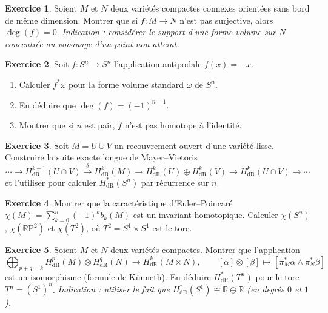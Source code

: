 \documentclass[12pt,a4paper,openany]{book}
\theoremstyle{definition}
\newtheorem{exercice}{Exercice}[chapter]
\theoremstyle{plain}
\theoremstyle{remark}
\newcommand{\R}{\mathbb{R}}
\begin{document}
\begin{exercice}\label{exo:stokes-7}
Soient $M$ et $N$ deux variétés compactes connexes orientées sans bord de même
dimension. Montrer que si $f \colon M \to N$ n'est pas surjective, alors
$\deg(f) = 0$.
\textit{Indication : considérer le support d'une forme volume sur $N$ concentrée
au voisinage d'un point non atteint.}
\end{exercice}

\begin{exercice}\label{exo:stokes-8}
Soit $f \colon S^n \to S^n$ l'application antipodale $f(x) = -x$.
\begin{enumerate}[label=(\alph*)]
  \item Calculer $f^*\omega$ pour la forme volume standard $\omega$ de $S^n$.
  \item En déduire que $\deg(f) = (-1)^{n+1}$.
  \item Montrer que si $n$ est pair, $f$ n'est pas homotope à l'identité.
\end{enumerate}
\end{exercice}

\begin{exercice}\label{exo:stokes-9}
Soit $M = U \cup V$ un recouvrement ouvert d'une variété lisse. Construire la
suite exacte longue de Mayer--Vietoris
\[
  \cdots \to H^{k-1}_{\mathrm{dR}}(U \cap V) \xrightarrow{\delta}
  H^k_{\mathrm{dR}}(M) \to H^k_{\mathrm{dR}}(U) \oplus H^k_{\mathrm{dR}}(V)
  \to H^k_{\mathrm{dR}}(U \cap V) \to \cdots
\]
et l'utiliser pour calculer $H^*_{\mathrm{dR}}(S^n)$ par récurrence sur $n$.
\end{exercice}

\begin{exercice}\label{exo:stokes-10}
Montrer que la caractéristique d'Euler--Poincaré $\chi(M) = \sum_{k=0}^n
(-1)^k b_k(M)$ est un invariant homotopique. Calculer $\chi(S^n)$,
$\chi(\R\mathrm{P}^2)$ et $\chi(T^2)$, où $T^2 = S^1 \times S^1$ est le tore.
\end{exercice}

\begin{exercice}\label{exo:stokes-11}
Soient $M$ et $N$ deux variétés compactes. Montrer que l'application
\[
  \bigoplus_{p+q=k} H^p_{\mathrm{dR}}(M) \otimes H^q_{\mathrm{dR}}(N)
  \to H^k_{\mathrm{dR}}(M \times N), \qquad
  [\alpha] \otimes [\beta] \mapsto [\pi_M^*\alpha \wedge \pi_N^*\beta]
\]
est un isomorphisme (formule de Künneth). En déduire
$H^*_{\mathrm{dR}}(T^n)$ pour le tore $T^n = (S^1)^n$.
\textit{Indication : utiliser le fait que $H^*_{\mathrm{dR}}(S^1) \cong
\R \oplus \R$ (en degrés $0$ et $1$).}
\end{exercice}
\end{document}
